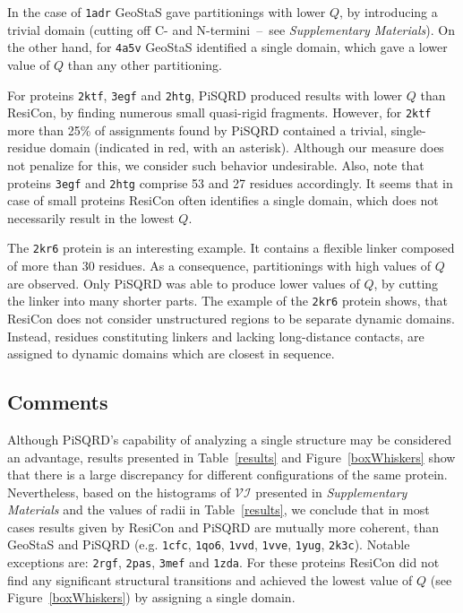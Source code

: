 \documentclass[a4paper,11pt,twoside]{book}%
\begin{document}
In the case of \texttt{1adr} GeoStaS gave partitionings with lower $Q$, by introducing a trivial domain (cutting off C- and N-termini~--~see \emph{Supplementary Materials}).
On the other hand, for \texttt{4a5v} GeoStaS identified a single domain, which gave a lower value of $Q$ than any other partitioning.

For proteins \texttt{2ktf}, \texttt{3egf} and \texttt{2htg}, PiSQRD produced results with lower $Q$ than ResiCon, by finding numerous small quasi-rigid fragments.
However, for \texttt{2ktf} more than 25\% of assignments found by PiSQRD contained a trivial, single-residue domain (indicated in red, with an asterisk).
Although our measure does not penalize for this, we consider such behavior undesirable.
Also, note that proteins \texttt{3egf} and \texttt{2htg} comprise 53 and 27 residues accordingly.
It seems that in case of small proteins ResiCon often identifies a single domain, which does not necessarily result in the lowest $Q$.

The \texttt{2kr6} protein is an interesting example. 
It contains a flexible linker composed of more than 30 residues.
As a consequence, partitionings with high values of $Q$ are observed.
Only PiSQRD was able to produce lower values of $Q$, by cutting the linker into many shorter parts.
The example of the \texttt{2kr6} protein shows, that ResiCon does not consider unstructured regions to be separate dynamic domains.
Instead, residues constituting linkers and lacking long-distance contacts, are assigned to dynamic domains which are closest in sequence.

\subsection*{Comments}
Although PiSQRD's capability of analyzing a single structure may be considered an advantage, results presented in Table~\ref{results} and Figure~\ref{boxWhiskers} show that there is a large discrepancy for different configurations of the same protein.
Nevertheless, based on the histograms of $\mathcal{VI}$ presented in \emph{Supplementary Materials} and the values of radii in Table~\ref{results}, we conclude that in most cases results given by ResiCon and PiSQRD are mutually more coherent, than GeoStaS and PiSQRD (e.g. \texttt{1cfc}, \texttt{1qo6}, \texttt{1vvd}, \texttt{1vve}, \texttt{1yug}, \texttt{2k3c}).
Notable exceptions are: \texttt{2rgf}, \texttt{2pas}, \texttt{3mef} and \texttt{1zda}. 
For these proteins ResiCon did not find any significant structural transitions and achieved the lowest value of $Q$ (see Figure~\ref{boxWhiskers}) by assigning a single domain.
\end{document}
